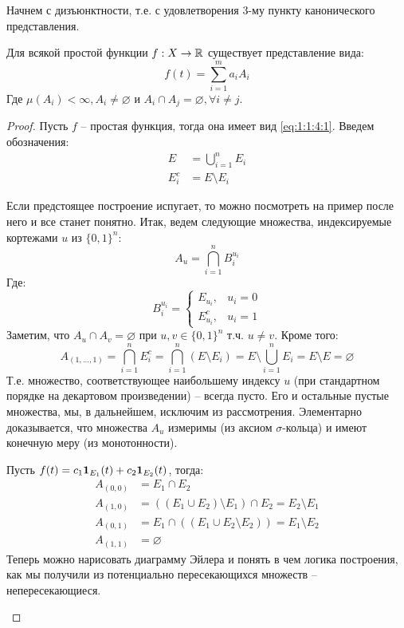 \documentclass[../main.tex]{subfiles}
\begin{document}
Начнем с дизъюнктности, т.е. с удовлетворения 3-му пункту канонического представления.
\begin{lemma}
	Для всякой простой функции $f : X \to \mathbb{R}$ существует представление вида:
	\begin{equation*}
		f(t) = \sum_{i=1}^{m}{a_i A_i}
	\end{equation*}
	Где $\mu(A_i) < \infty, A_i \neq \varnothing$ и $A_i \cap A_j = \varnothing, \forall i \neq j$.
\end{lemma}
\begin{proof}
	Пусть $f$ -- простая функция, тогда она имеет вид \eqref{eq:1:1:4:1}. Введем обозначения:
	\begin{align*}
		E &= \bigcup_{i=1}^{n}{E_i} \\
		E_i^c &= E \setminus E_i
	\end{align*}
	
	Если предстоящее построение испугает, то можно посмотреть на пример после него и все станет понятно. Итак, ведем следующие множества, индексируемые кортежами $u$ из $\{0, 1\}^n$:
	\begin{equation}\label{eq:1:1:4:2}
		A_u = \bigcap_{i=1}^{n}{B_i^{u_i}}
	\end{equation}
	Где:
	$$B_i^{u_i} = \begin{cases}
		E_{u_i}, &u_i = 0 \\
		E_{u_i}^c, &u_i = 1
	\end{cases}$$
	Заметим, что $A_u \cap A_v = \varnothing$ при $u, v \in \{0, 1\}^n$ т.ч. $u \neq v$. Кроме того:
	$$A_{(1, ..., 1)} = \bigcap_{i=1}^{n}{E_i^c} = \bigcap_{i=1}^{n}{(E \setminus E_i)} = E \setminus \bigcup_{i=1}^{n}{E_i} = E \setminus E = \varnothing$$
	Т.е. множество, соответствующее наибольшему индексу $u$ (при стандартном порядке на декартовом произведении) -- всегда пусто. Его и остальные пустые множества, мы, в дальнейшем, исключим из рассмотрения. Элементарно доказывается, что множества $A_u$ измеримы (из аксиом $\sigma$-кольца) и имеют конечную меру (из монотонности).
	
	\begin{example}
		Пусть $f(t) = c_1 \mathbf{1}_{E_1} (t) + c_2 \mathbf{1}_{E_2} (t)$, тогда:
		\begin{align*}
			A_{(0, 0)} &= E_1 \cap E_2 \\
			A_{(1, 0)} &= ((E_1 \cup E_2) \setminus E_1) \cap E_2 = E_2 \setminus E_1 \\
			A_{(0, 1)} &= E_1 \cap ((E_1 \cup E_2 \setminus E_2)) = E_1 \setminus E_2 \\
			A_{(1, 1)} &= \varnothing
		\end{align*}
		Теперь можно нарисовать диаграмму Эйлера и понять в чем логика построения, как мы получили из потенциально пересекающихся множеств -- непересекающиеся.
	\end{example}


\end{proof}
\end{document}
